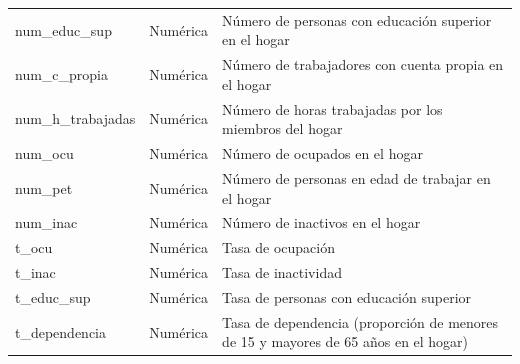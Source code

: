 \documentclass[12pt,a4paper,onecolumn]{article}
\begin{document}
\begin{table}[H]
{\begin{tabular}{lll}
num\_educ\_sup & Numérica & Número de personas con educación superior en el hogar \\
num\_c\_propia & Numérica & Número de trabajadores con cuenta propia en el hogar \\
num\_h\_trabajadas & Numérica & Número de horas trabajadas por los miembros del hogar \\
num\_ocu & Numérica & Número de ocupados en el hogar \\
num\_pet & Numérica & Número de personas en edad de trabajar en el hogar \\
num\_inac & Numérica & Número de inactivos en el hogar \\
t\_ocu & Numérica & Tasa de ocupación \\
t\_inac & Numérica & Tasa de inactividad \\
t\_educ\_sup & Numérica & Tasa de personas con educación superior \\
t\_dependencia & Numérica & Tasa de dependencia (proporción de menores de 15 y mayores de 65 años en el hogar) \\
\bottomrule
\end{tabular}%
}
\end{table}
\end{document}
